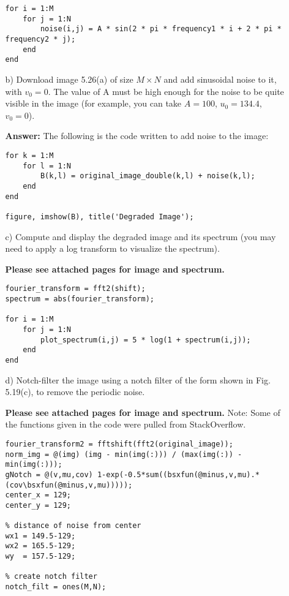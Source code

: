 \documentclass{article}
\begin{document}
\begin{enumerate}
\begin{enumerate}
\begin{lstlisting}
for i = 1:M
    for j = 1:N
        noise(i,j) = A * sin(2 * pi * frequency1 * i + 2 * pi * frequency2 * j);
    end
end
\end{lstlisting}

\item[b)] Download image 5.26(a) of size $M\times N$ and add sinusoidal noise to it, with $v_0 = 0$.  The value of A must be high enough for the 
noise to be quite visible in the image (for example, you can take $A=100$, $u_0=134.4$, $v_0=0$). 

\textbf{Answer:} The following is the code written to add noise to the image:

\begin{lstlisting}
for k = 1:M
    for l = 1:N
        B(k,l) = original_image_double(k,l) + noise(k,l);
    end
end

figure, imshow(B), title('Degraded Image');
\end{lstlisting}

\newpage
\item[c)]  Compute and display the degraded image and its spectrum (you may need to apply a log transform to visualize the spectrum).  

\textbf{Please see attached pages for image and spectrum.}

\begin{lstlisting}
fourier_transform = fft2(shift);
spectrum = abs(fourier_transform);

for i = 1:M
    for j = 1:N
        plot_spectrum(i,j) = 5 * log(1 + spectrum(i,j));
    end
end
\end{lstlisting}

\item[d)] Notch-filter the image using a notch filter of the form shown in Fig. 5.19(c), to remove the periodic noise. 

\textbf{Please see attached pages for image and spectrum.} \newline Note: Some of the functions given in the code were pulled from StackOverflow.

\begin{lstlisting}
fourier_transform2 = fftshift(fft2(original_image));
norm_img = @(img) (img - min(img(:))) / (max(img(:)) - min(img(:)));
gNotch = @(v,mu,cov) 1-exp(-0.5*sum((bsxfun(@minus,v,mu).*(cov\bsxfun(@minus,v,mu)))));
center_x = 129;
center_y = 129;

% distance of noise from center
wx1 = 149.5-129;
wx2 = 165.5-129;
wy  = 157.5-129;

% create notch filter
notch_filt = ones(M,N);


\end{lstlisting}
\end{enumerate}
\end{enumerate}
\end{document}
